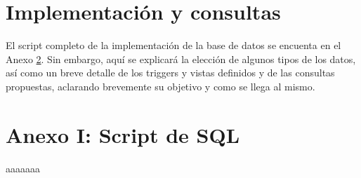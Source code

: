 \documentclass[a4paper,onecolumn]{article}
\let\stdsection\section
\renewcommand\section{\newpage\stdsection}
\begin{document}
\begin{sloppypar}
\section{Implementación y consultas} \label{sql}
El script completo de la implementación de la base de datos se encuenta en el Anexo \ref{anexo1}. Sin embargo, aquí se 
explicará la elección de algunos tipos de los datos, así como un breve detalle de los triggers y vistas definidos y de las consultas propuestas, 
aclarando brevemente su objetivo y como se llega al mismo.


\newpage

\appendix
\section{Anexo I: Script de SQL}\label{anexo1}
aaaaaaa



\end{sloppypar}
\end{document}
